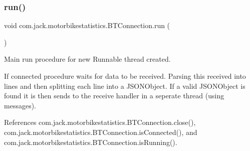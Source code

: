 \subsubsection{\texorpdfstring{run()}{run()}}
{\footnotesize\ttfamily void com.\+jack.\+motorbikestatistics.\+B\+T\+Connection.\+run (\begin{DoxyParamCaption}{ }\end{DoxyParamCaption})\hspace{0.3cm}{\ttfamily [inline]}}



Main run procedure for new Runnable thread created. 

If connected procedure waits for data to be received. Parsing this received into lines and then splitting each line into a J\+S\+O\+N\+Object. If a valid J\+S\+O\+N\+Object is found it is then sends to the receive handler in a seperate thread (using messages). 

References com.\+jack.\+motorbikestatistics.\+B\+T\+Connection.\+close(), com.\+jack.\+motorbikestatistics.\+B\+T\+Connection.\+is\+Connected(), and com.\+jack.\+motorbikestatistics.\+B\+T\+Connection.\+is\+Running().



